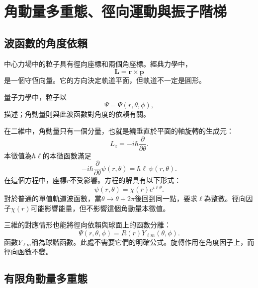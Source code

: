 \chapter{角動量多重態、徑向運動與振子階梯}

\section{波函數的角度依賴}

中心力場中的粒子具有徑向座標和兩個角座標。經典力學中，
\begin{equation}
\mathbf L=\mathbf r\times\mathbf p
\end{equation}
是一個守恆向量。它的方向決定軌道平面，但軌道不一定是圓形。

量子力學中，粒子以
\begin{equation}
\Psi=\Psi(r,\theta,\phi),
\end{equation}
描述；角動量則與此波函數對角度的依賴有關。

在二維中，角動量只有一個分量，也就是繞垂直於平面的軸旋轉的生成元：
\begin{equation}
L_z=-i\hbar\frac{\partial}{\partial\theta}.
\end{equation}
本徵值為\(\hbar\ell\)的本徵函數滿足
\begin{equation}
-i\hbar\frac{\partial}{\partial\theta}\psi(r,\theta)
=\hbar\ell\,\psi(r,\theta).
\end{equation}
在這個方程中，座標\(r\)不受影響。方程的解具有以下形式：
\begin{equation}
\psi(r,\theta)=\chi(r)e^{i\ell\theta}.
\end{equation}
對於普通的單值軌道波函數，當\(\theta\to\theta+2\pi\)後回到同一點，要求\(\ell\)為整數。徑向因子\(\chi(r)\)可能影響能量，但不影響這個角動量本徵值。

三維的對應情形也能將徑向依賴與球面上的函數分離：
\begin{equation}
\Psi(r,\theta,\phi)=R(r)Y_{\ell m}(\theta,\phi).
\end{equation}
函數\(Y_{\ell m}\)稱為球諧函數。此處不需要它們的明確公式。旋轉作用在角度因子上，而徑向函數不變。

\section{有限角動量多重態}

